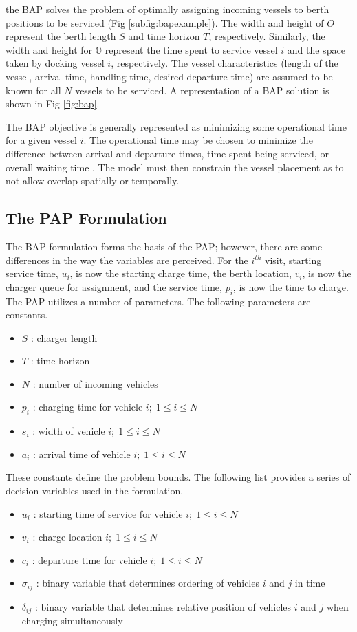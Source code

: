 \documentclass[letterpaper, 10pt, conference]{IEEEtran}
\begin{document}
the BAP solves the problem of optimally assigning incoming vessels to berth positions to be serviced (Fig
\ref{subfig:bapexample}). The width and height of $O$ represent the berth length $S$ and time horizon $T$, respectively.
Similarly, the width and height for $\mathbb{O}$ represent the time spent to service vessel $i$ and the space taken by
docking vessel $i$, respectively. The vessel characteristics (length of the vessel, arrival time, handling time, desired
departure time) are assumed to be known for all $N$ vessels to be serviced. A representation of a BAP solution is shown
in Fig \ref{fig:bap}.

The BAP objective is generally represented as minimizing some operational time for a given vessel $i$. The operational
time may be chosen to minimize the difference between arrival and departure times, time spent being serviced, or overall
waiting time \cite{Voss2007, Buhrkal2010,Frojan2015}. The model must then constrain the vessel placement as to not allow
overlap spatially or temporally.

\subsection{The PAP Formulation}
The BAP formulation forms the basis of the PAP; however, there are some differences in the way the variables are
perceived. For the $i^{th}$ visit, starting service time, $u_i$, is now the starting charge time, the berth location,
$v_i$, is now the charger queue for assignment, and the service time, $p_i$, is now the time to charge. The PAP utilizes
a number of parameters. The following parameters are constants.

\begin{itemize}
	\item $S$   : charger length
	\item $T$   : time horizon
	\item $N$   : number of incoming vehicles
	\item $p_i$ : charging time for vehicle $i;\; 1 \leq i \leq N$
	\item $s_i$ : width of vehicle $i;\; 1 \leq i \leq N$
	\item $a_i$ : arrival time of vehicle $i;\; 1 \leq i \leq N$
\end{itemize}

These constants define the problem bounds. The following list provides a series of decision variables used in the
formulation.

\begin{itemize}
    \item $u_i$         : starting time of service for vehicle $i;\; 1 \leq i \leq N$
    \item $v_i$         : charge location $i;\; 1 \leq i \leq N$
    \item $c_i$         : departure time for vehicle $i;\; 1 \leq i \leq N$
    \item $\sigma_{ij}$ : binary variable that determines ordering of vehicles $i$ and $j$ in time
    \item $\delta_{ij}$ : binary variable that determines relative position of vehicles $i$ and $j$ when charging simultaneously
\end{itemize}
\end{document}

